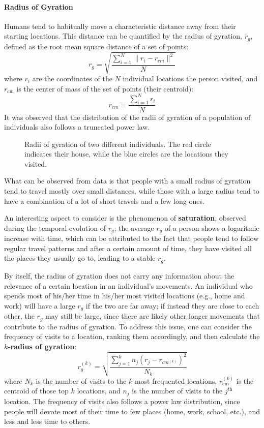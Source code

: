 \paragraph{Radius of Gyration}
Humans tend to habitually move a characteristic distance away from their starting locations. This distance can be quantified by the radius of gyration, $r_g$, defined as the root mean square distance of a set of points:
\begin{equation*}
    r_g = \sqrt{\frac{\sum_{i=1}^{N} \| r_i - r_{\textit{cm}} \|^2}{N}}
\end{equation*}
where $r_i$ are the coordinates of the $N$ individual locations the person visited, and $r_{\text{cm}}$ is the center of mass of the set of points (their centroid):
\begin{equation}
    r_{\textit{cm}} = \frac{\sum_{i=1}^{N} r_i}{N} 
\end{equation}
It was observed that the distribution of the radii of gyration of a population of individuals also follows a truncated power law.
\begin{figure}[H]
    \centering
    
    \caption{Radii of gyration of two different individuals. The red circle indicates their house, while the blue circles are the locations they visited.}
\end{figure}
What can be observed from data is that people with a small radius of gyration tend to travel mostly over small distances, while those with a large radius tend to have a combination of a lot of short travels and a few long ones.

An interesting aspect to consider is the phenomenon of \textbf{saturation}, observed during the temporal evolution of $r_g$; the average $r_g$ of a person shows a logaritmic increase with time, which can be attributed to the fact that people tend to follow regular travel patterns and after a certain amount of time, they have visited all the places they usually go to, leading to a stable $r_g$.

By itself, the radius of gyration does not carry any information about the relevance of a certain location in an individual's movements. An individual who spends most of his/her time in his/her most visited locations (e.g., home and work) will have a large $r_g$ if the two are far away; if instead they are close to each other, the $r_g$ may still be large, since there are likely other longer movements that contribute to the radius of gyration. To address this issue, one can consider the frequency of visits to a location, ranking them accordingly, and then calculate the \textbf{$k$-radius of gyration}:
\begin{equation*}
    r_g^{(k)} = \sqrt{\frac{\sum_{j=1}^k n_j (r_j - r_{\textit{cm}^{(k)}})^2}{N_k}}
\end{equation*}
where $N_k$ is the number of visits to the $k$ most frequented locations, $r_{\text{cm}}^{(k)}$ is the centroid of those top $k$ locations, and $n_j$ is the number of visits to the $j^{\textit{th}}$ location. The frequency of visits also follows a power law distribution, since people will devote most of their time to few places (home, work, school, etc.), and less and less time to others.

